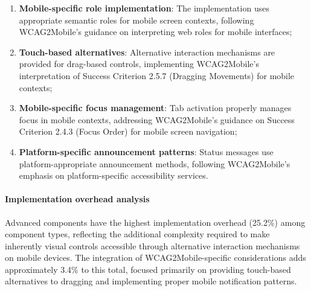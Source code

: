 \begin{enumerate}
    \item \textbf{Mobile-specific role implementation}: The implementation uses appropriate semantic roles for mobile screen contexts, following WCAG2Mobile's guidance on interpreting web roles for mobile interfaces;
    
    \item \textbf{Touch-based alternatives}: Alternative interaction mechanisms are provided for drag-based controls, implementing WCAG2Mobile's interpretation of Success Criterion 2.5.7 (Dragging Movements) for mobile contexts;
    
    \item \textbf{Mobile-specific focus management}: Tab activation properly manages focus in mobile contexts, addressing WCAG2Mobile's guidance on Success Criterion 2.4.3 (Focus Order) for mobile screen navigation;
    
    \item \textbf{Platform-specific announcement patterns}: Status messages use platform-appropriate announcement methods, following WCAG2Mobile's emphasis on platform-specific accessibility services.
\end{enumerate}

\paragraph{Implementation overhead analysis}

Advanced components have the highest implementation overhead (25.2\%) among component types, reflecting the additional complexity required to make inherently visual controls accessible through alternative interaction mechanisms on mobile devices. The integration of WCAG2Mobile-specific considerations adds approximately 3.4\% to this total, focused primarily on providing touch-based alternatives to dragging and implementing proper mobile notification patterns.

